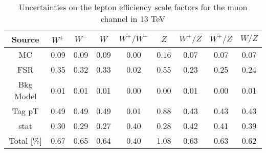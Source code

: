 \begin{table}[htbp]
\begin{center}
\begin{tabular}{ccccccccc}
\hline
Source & $W^+$& $W^-$ & $W$ & $W^+/W^-$ & $Z$ & $W^+/Z$&$W^+/Z$ &$W/Z$  \\
\hline \hline
MC & 0.09 & 0.09 & 0.09 & 0.00 & 0.16 & 0.07 & 0.07 & 0.07 \\
FSR & 0.35 & 0.32 & 0.33 & 0.02 & 0.55 & 0.23 & 0.25 & 0.24 \\
Bkg Model & 0.01 & 0.01 & 0.01 & 0.00 & 0.00 & 0.01 & 0.00 & 0.01 \\
Tag pT & 0.49 & 0.49 & 0.49 & 0.01 & 0.88 & 0.43 & 0.43 & 0.43 \\
stat & 0.30 & 0.29 & 0.27 & 0.40 & 0.28 & 0.42 & 0.41 & 0.39 \\
\hline \hline
Total [\%] & 0.67 & 0.65 & 0.64 & 0.40 & 1.08 & 0.63 & 0.63 & 0.62 \\
\end{tabular}
\end{center}
\caption{Uncertainties on the lepton efficiency scale factors for the muon channel in 13 TeV}
\label{tab:Eff:Unc:muon:summary:13}
\end{table}
